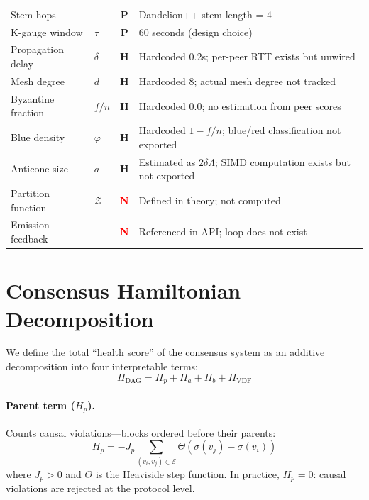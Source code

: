 \documentclass[11pt,a4paper,twocolumn]{article}
\begin{document}
\begin{table}[t]
\begin{tabular}{@{}llcl@{}}
Stem hops            & ---        & \textcolor{sectionblue}{\textbf{P}} & Dandelion++ stem length = 4 \\
K-gauge window       & $\tau$     & \textcolor{sectionblue}{\textbf{P}} & 60 seconds (design choice) \\
\midrule
Propagation delay    & $\delta$   & \textcolor{hardcoded}{\textbf{H}} & Hardcoded 0.2s; per-peer RTT exists but unwired \\
Mesh degree          & $d$        & \textcolor{hardcoded}{\textbf{H}} & Hardcoded 8; actual mesh degree not tracked \\
Byzantine fraction   & $f/n$      & \textcolor{hardcoded}{\textbf{H}} & Hardcoded 0.0; no estimation from peer scores \\
Blue density         & $\varphi$  & \textcolor{hardcoded}{\textbf{H}} & Hardcoded $1-f/n$; blue/red classification not exported \\
Anticone size        & $\bar{a}$  & \textcolor{hardcoded}{\textbf{H}} & Estimated as $2\delta\Lambda$; SIMD computation exists but not exported \\
\midrule
Partition function   & $\mathcal{Z}$ & \textcolor{red}{\textbf{N}} & Defined in theory; not computed \\
Emission feedback    & ---        & \textcolor{red}{\textbf{N}} & Referenced in API; loop does not exist \\
\bottomrule
\end{tabular}
\end{table}

\section{Consensus Hamiltonian Decomposition}

We define the total ``health score'' of the consensus system as an additive decomposition into four interpretable terms:
\begin{equation}
\boxed{H_{\text{DAG}} = H_p + H_a + H_b + H_{\text{VDF}}}
\label{eq:hamiltonian}
\end{equation}

\paragraph{Parent term ($H_p$).} Counts causal violations---blocks ordered before their parents:
\begin{equation}
H_p = -J_p \sum_{(v_i, v_j) \in \mathcal{E}} \Theta(\sigma(v_j) - \sigma(v_i))
\end{equation}
where $J_p > 0$ and $\Theta$ is the Heaviside step function. In practice, $H_p = 0$: causal violations are rejected at the protocol level.
\end{document}
